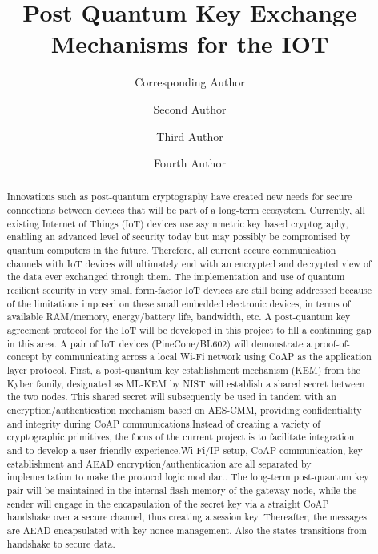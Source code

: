\documentclass[USenglish,oneside,twocolumn]{article}
\begin{document}
	\author*[1]{Corresponding Author}
	\author[2]{Second Author}
	\author[3]{Third Author}
	\author[4]{Fourth Author}
	
	

	\title{\huge Post Quantum Key Exchange Mechanisms for the IOT}


	
 	\begin{abstract}
		{Innovations such as post-quantum cryptography have created new needs for secure connections between devices that will be part of a long-term ecosystem. Currently, all existing Internet of Things (IoT) devices use asymmetric key based cryptography, enabling an advanced level of security today but may possibly be compromised by quantum computers in the future. Therefore, all current secure communication channels with IoT devices will ultimately end with an encrypted and decrypted view of the data ever exchanged through them. The implementation and use of quantum resilient security in very small form-factor IoT devices are still being addressed because of the limitations imposed on these small embedded electronic devices, in terms of available RAM/memory, energy/battery life, bandwidth, etc. A post-quantum key agreement protocol for the IoT will be developed in this project to fill a continuing gap in this area. A pair of IoT devices (PineCone/BL602) will demonstrate a proof-of-concept by communicating across a local Wi-Fi network using CoAP as the application layer protocol. First, a post-quantum key establishment mechanism (KEM) from the Kyber family, designated as ML-KEM by NIST will establish a shared secret between the two nodes. This shared secret will subsequently be used in tandem with an encryption/authentication mechanism based on AES-CMM, providing confidentiality and integrity during CoAP communications.Instead of creating a variety of cryptographic primitives, the focus of the current project is to facilitate integration and to develop a user-friendly experience.Wi-Fi/IP setup, CoAP communication, key establishment and AEAD encryption/authentication are all separated by implementation to make the protocol logic modular.. The long-term post-quantum key pair will be maintained in the internal flash memory of the gateway node, while the sender will engage in the encapsulation of the secret key via a straight CoAP handshake over a secure channel, thus creating a session key. Thereafter, the messages are AEAD encapsulated with key nonce management. Also the states transitions from handshake to secure data.
}
\end{abstract}
\end{document}
